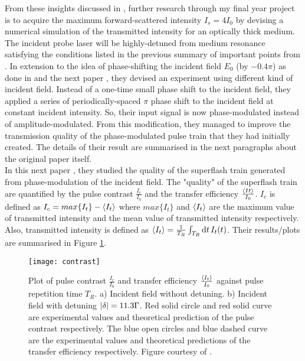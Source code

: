 From these insights discussed in \cite{Kwong2014}, further research through my final year project is to acquire the maximum forward-scattered intensity $I_{s} = 4 I_{0}$ by devising a numerical simulation of the transmitted intensity for an optically thick medium. The incident probe laser will be highly-detuned from medium resonance satisfying the conditions listed in the previous summary of important points from \cite{Kwong2014}. In extension to the idea of phase-shifting the incident field $E_{0}$ (by $-0.4\pi$) as done in \cite{Kwong2014} and the next paper \cite{Kwong2015}, they devised an experiment using different kind of incident field. Instead of a one-time small phase shift to the incident field, they applied a series of periodically-spaced $\pi$ phase shift to the incident field at constant incident intensity. So, their input signal is now phase-modulated instead of amplitude-modulated. From this modification, they managed to improve the transmission quality of the phase-modulated pulse train that they had initially created. The details of their result are summarised in the next paragraphs about the original paper \cite{Kwong2015} itself.\\

In this next paper \cite{Kwong2015}, they studied the quality of the superflash train generated from phase-modulation of the incident field. The "quality" of the superflash train are quantified by the pulse contrast  $\frac{I_{c}}{I_{0}}$ and the transfer efficiency $\frac{\expval{I_{}t}}{I_{0}}$. $I_{c}$ is defined as $I_{c} = max\{I_{t}\} - \expval{I_{t}}$ where $max\{I_{t}\}$ and $\expval{I_{t}}$ are the maximum value of transmitted intensity and the mean value of transmitted intensity respectively. Also, transmitted intensity is defined as $\expval{I_{t}} = \frac{1}{T_{R}} \int_{T_{R}} \dd{t} I_{t}(t)$. Their results/plots are summarised in Figure \ref{fig: contrast}.

\begin{figure}[h!]
    \centering
    \texttt{[image: contrast]}
    \caption{Plot of pulse contrast $\frac{I_{c}}{I_{0}}$ and transfer efficiency $\frac{\expval{I_{t}}}{I_{0}}$ against pulse repetition time $T_{R}$. a) Incident field without detuning. b) Incident field with detuning $\abs{\delta} = 11.3 \Gamma$. Red solid circle and red solid curve are experimental values and theoretical prediction of the pulse contrast respectively. The blue open circles and blue dashed curve are the experimental values and theoretical predictions of the transfer efficiency respectively. Figure courtesy of \cite{Kwong2015}.}
    \label{fig: contrast}
\end{figure}

